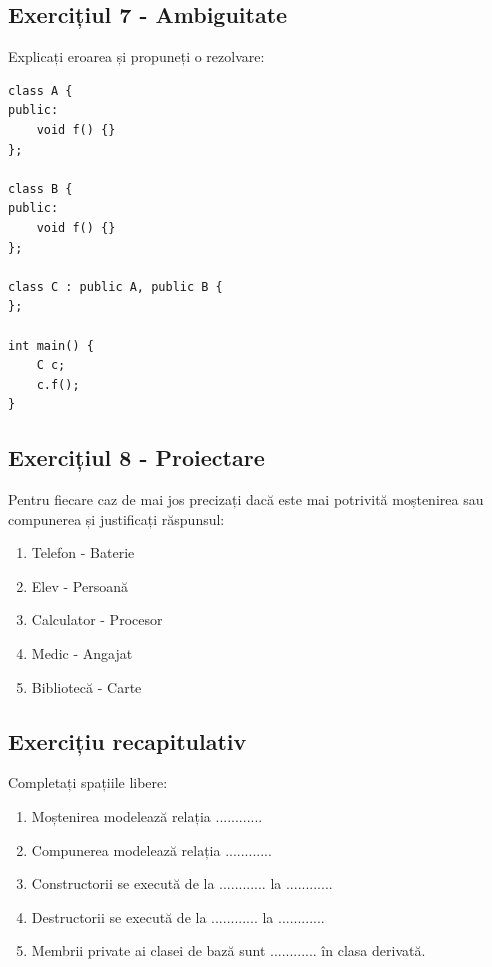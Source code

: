 \documentclass[12pt,a4paper]{article}
\begin{document}
\subsection{Exercițiul 7 - Ambiguitate}

Explicați eroarea și propuneți o rezolvare:

\begin{verbatim}
class A {
public:
    void f() {}
};

class B {
public:
    void f() {}
};

class C : public A, public B {
};

int main() {
    C c;
    c.f();
}
\end{verbatim}

\subsection{Exercițiul 8 - Proiectare}

Pentru fiecare caz de mai jos precizați dacă este mai potrivită moștenirea sau compunerea și justificați răspunsul:

\begin{enumerate}
\item Telefon - Baterie
\item Elev - Persoană
\item Calculator - Procesor
\item Medic - Angajat
\item Bibliotecă - Carte
\end{enumerate}

\subsection{Exercițiu recapitulativ}

Completați spațiile libere:

\begin{enumerate}
\item Moștenirea modelează relația ............
\item Compunerea modelează relația ............
\item Constructorii se execută de la ............ la ............
\item Destructorii se execută de la ............ la ............
\item Membrii private ai clasei de bază sunt ............ în clasa derivată.
\end{enumerate}
\end{document}
